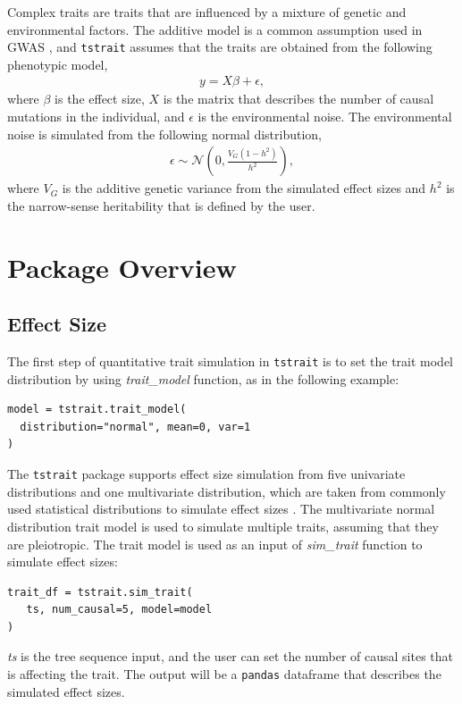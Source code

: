 \documentclass[unnumsec,webpdf,modern,large,namedate]{oup-authoring-template}%
\theoremstyle{thmstyleone}%
\theoremstyle{thmstyletwo}%
\theoremstyle{thmstylethree}%
\begin{document}
Complex traits are traits that are influenced by a mixture of genetic and environmental factors. The additive model is a common assumption used in GWAS \citep{uffelmann2021}, and \texttt{tstrait} assumes that the traits are obtained from the following phenotypic model,
\begin{align}\label{eq:additive-model}
    y=X\beta+\epsilon,
\end{align}
where $\beta$ is the effect size, $X$ is the matrix that describes the number of causal mutations in the individual, and $\epsilon$ is the environmental noise. The environmental noise is simulated from the following normal distribution,
\begin{align}\label{eq:env}
    \epsilon\sim \mathcal{N}\left(0,\frac{V_G(1-h^2)}{h^2}\right),
\end{align}
where $V_G$ is the additive genetic variance from the simulated effect sizes and $h^2$ is the narrow-sense heritability that is defined by the user.

\section{Package Overview}

\subsection{Effect Size}

The first step of quantitative trait simulation in \texttt{tstrait} is to set the trait model distribution by using \emph{trait\_model} function, as in the following example:
\begin{verbatim}
model = tstrait.trait_model(
  distribution="normal", mean=0, var=1
)
\end{verbatim}
The \texttt{tstrait} package supports effect size simulation from five univariate distributions and one multivariate distribution, which are taken from commonly used statistical distributions to simulate effect sizes \citep{gaynor2021,haller2023}. The multivariate normal distribution trait model is used to simulate multiple traits, assuming that they are pleiotropic. The trait model is used as an input of \emph{sim\_trait} function to simulate effect sizes:
\begin{verbatim}
trait_df = tstrait.sim_trait(
   ts, num_causal=5, model=model
)
\end{verbatim}
\emph{ts} is the tree sequence input, and the user can set the number of causal sites that is affecting the trait. The output will be a \texttt{pandas} dataframe \citep{pandas} that describes the simulated effect sizes.
\end{document}
